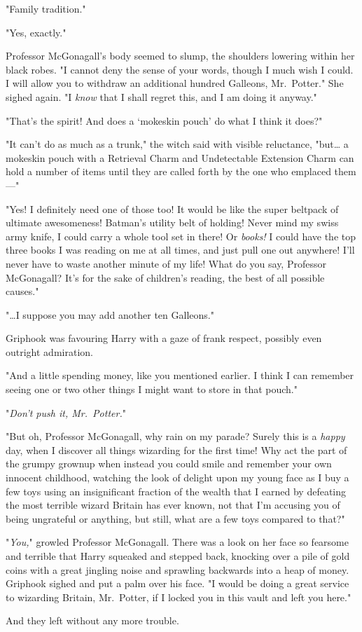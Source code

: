 "Family tradition."

"Yes, exactly."

Professor McGonagall's body seemed to slump, the shoulders lowering within her
black robes. "I cannot deny the sense of your words, though I much wish I
could. I will allow you to withdraw an additional hundred Galleons,
Mr.~Potter." She sighed again. "I \emph{know} that I shall regret this, and I
am doing it anyway."

"That's the spirit! And does a `mokeskin pouch' do what I think it does?"

"It can't do as much as a trunk," the witch said with visible reluctance,
"but{\ldots} a mokeskin pouch with a Retrieval Charm and Undetectable Extension
Charm can hold a number of items until they are called forth by the one who
emplaced them---"

"Yes! I definitely need one of those too! It would be like the super beltpack
of ultimate awesomeness! Batman's utility belt of holding! Never mind my swiss
army knife, I could carry a whole tool set in there! Or \emph{books!} I could
have the top three books I was reading on me at all times, and just pull one
out anywhere! I'll never have to waste another minute of my life! What do you
say, Professor McGonagall? It's for the sake of children's reading, the best of
all possible causes."

"{\ldots}I suppose you may add another ten Galleons."

Griphook was favouring Harry with a gaze of frank respect, possibly even
outright admiration.

"And a little spending money, like you mentioned earlier. I think I can
remember seeing one or two other things I might want to store in that pouch."

"\emph{Don't push it, Mr.~Potter.}"

"But oh, Professor McGonagall, why rain on my parade? Surely this is a
\emph{happy} day, when I discover all things wizarding for the first time! Why
act the part of the grumpy grownup when instead you could smile and remember
your own innocent childhood, watching the look of delight upon my young face as
I buy a few toys using an insignificant fraction of the wealth that I earned by
defeating the most terrible wizard Britain has ever known, not that I'm
accusing you of being ungrateful or anything, but still, what are a few toys
compared to that?"

"\emph{You,}" growled Professor McGonagall. There was a look on her face so
fearsome and terrible that Harry squeaked and stepped back, knocking over a
pile of gold coins with a great jingling noise and sprawling backwards into a
heap of money. Griphook sighed and put a palm over his face. "I would be doing
a great service to wizarding Britain, Mr.~Potter, if I locked you in this vault
and left you here."

And they left without any more trouble.
